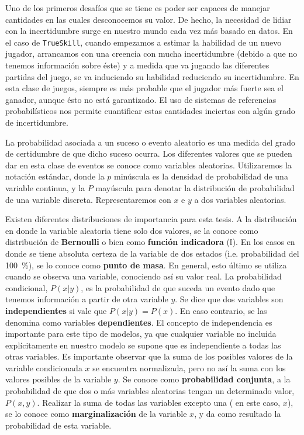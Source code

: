 \documentclass[11pt,twoside,spanish]{report} %
\begin{document}
Uno de los primeros desaf\'ios que se tiene es poder ser capaces de manejar cantidades en las cuales desconocemos su valor.
De hecho, la necesidad de lidiar con la incertidumbre surge en nuestro mundo cada vez m\'as basado en datos.
En el caso de \texttt{TrueSkill}, cuando empezamos a estimar la habilidad de un nuevo jugador, arrancamos con una creencia con mucha incertidumbre (debido a que no tenemos informaci\'on sobre \'este) y a medida que va jugando las diferentes partidas del juego, se va induciendo su habilidad reduciendo su incertidumbre.
En esta clase de juegos, siempre es m\'as probable que el jugador m\'as fuerte sea el ganador, aunque \'esto no est\'a garantizado.
El uso de sistemas de referencias probabil\'isticos nos permite cuantificar estas cantidades inciertas con alg\'un grado de incertidumbre.

La probabilidad asociada a un suceso o evento aleatorio es una medida del grado de certidumbre de que dicho suceso ocurra.
Los diferentes valores que se pueden dar en esta  clase de eventos se conoce como variables aleatorias.
Utilizaremos la notaci\'on est\'andar, donde la $p$ min\'uscula es la densidad de probabilidad de una variable continua, y la $P$ may\'uscula para denotar la distribuci\'on de probabilidad de una variable discreta.
Representaremos con $x$ e $y$ a dos variables aleatorias.

Existen diferentes distribuciones de importancia para esta tesis.
A la distribuci\'on en donde la variable aleatoria tiene solo dos valores, se la conoce como distribuci\'on de \textbf{Bernoulli} o bien como \textbf{funci\'on indicadora} ($\mathbb{I}$).
En los casos en donde se tiene absoluta certeza de la variable de dos estados (i.e. probabilidad del \SI{100}{\percent}),  se lo conoce como \textbf{punto de masa}.
En general, esto \'ultimo se utiliza cuando se observa una variable, conociendo as\'i su valor real.
La probabilidad condicional, $P(x|y)$, es la probabilidad de que suceda un evento dado que tenemos informaci\'on a partir de otra variable $y$.
Se dice que dos variables son \textbf{independientes} si vale que $P(x|y) = P(x)$.
En caso contrario, se las denomina como variables \textbf{dependientes}.
El concepto de independencia es importante para este tipo de modelos, ya que cualquier variable no incluida expl\'icitamente en nuestro modelo se supone que es independiente a todas las otras variables.
Es importante observar que la suma de los posibles valores de la variable condicionada $x$ se encuentra normalizada, pero no as\'i la suma con los valores posibles de la variable $y$.
Se conoce como \textbf{probabilidad conjunta}, a la probabilidad de que dos o m\'as variables aleatorias tengan un determinado valor, $P(x,y)$.
Realizar la suma de todas las variables excepto una ( en este caso, $x$), se lo conoce como \textbf{marginalizaci\'on} de la variable $x$, y da como resultado la probabilidad de esta variable.
\end{document}
